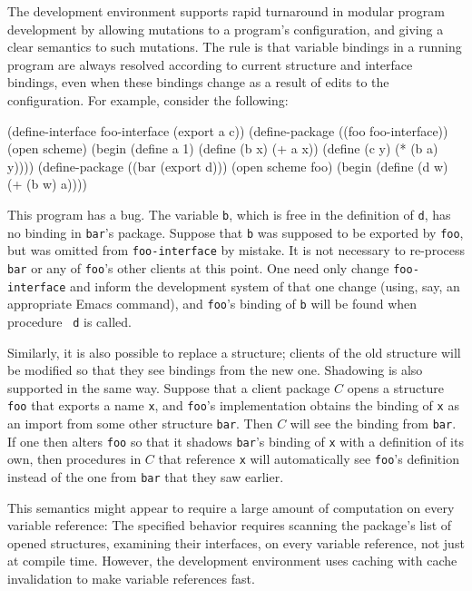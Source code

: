 The \hack{} development environment supports rapid turnaround in
modular program development by allowing mutations to a program's
configuration, and giving a clear semantics to such mutations.  The
rule is that variable bindings in a running program are always
resolved according to current structure and interface bindings, even
when these bindings change as a result of edits to the configuration.
For example, consider the following:
\begin{code}
    (define-interface foo-interface (export a c))
    (define-package ((foo foo-interface))
      (open scheme)
      (begin (define a 1)
	     (define (b x) (+ a x))
	     (define (c y) (* (b a) y))))
    (define-package ((bar (export d)))
      (open scheme foo)
      (begin (define (d w) (+ (b w) a))))
\end{code}
This program has a bug.  The variable {\tt b}, which is free in the
definition of {\tt d}, has no binding in {\tt bar}'s package.  Suppose
that {\tt b} was supposed to be exported by {\tt foo}, but was omitted
from {\tt foo-interface} by mistake.  It is not necessary to
re-process {\tt bar} or any of {\tt foo}'s other clients at this point.
One need only change {\tt foo-interface} and inform the development
system of that one change (using, say, an appropriate Emacs command),
and {\tt foo}'s binding of {\tt b} will be found when procedure {\tt
d} is called.

Similarly, it is also possible to replace a structure; clients of the
old structure will be modified so that they see bindings from the new
one.  Shadowing is also supported in the same way.  Suppose that a
client package $C$ opens a structure {\tt foo} that exports a name
{\tt x}, and {\tt foo}'s implementation obtains the binding of {\tt x}
as an import from some other structure {\tt bar}.  Then $C$ will see
the binding from {\tt bar}.  If one then alters {\tt foo} so that it
shadows {\tt bar}'s binding of {\tt x} with a definition of its own,
then procedures in $C$ that reference {\tt x} will automatically see
{\tt foo}'s definition instead of the one from {\tt bar} that they saw
earlier.

This semantics might appear to require a large amount of computation
on every variable reference: The specified behavior requires scanning
the package's list of opened structures, examining their interfaces,
on every variable reference, not just at compile time.  However, the
development environment uses caching with cache invalidation to make
variable references fast.


